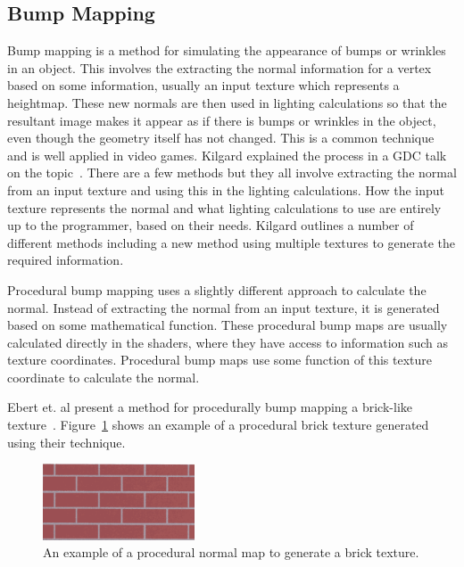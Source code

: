 \subsection{Bump Mapping}
\label{sec:bumpmapping}
Bump mapping is a method for simulating the appearance of bumps or wrinkles in an object.
This involves the extracting the normal information for a vertex based on some information, usually an input texture which represents a heightmap.
These new normals are then used in lighting calculations so that the resultant image makes it appear as if there is bumps or wrinkles in the object, even though the geometry itself has not changed.
This is a common technique and is well applied in video games.
Kilgard explained the process in a GDC talk on the topic~\cite{kilgard2000practical}.
There are a few methods but they all involve extracting the normal from an input texture and using this in the lighting calculations.
How the input texture represents the normal and what lighting calculations to use are entirely up to the programmer, based on their needs. 
Kilgard outlines a number of different methods including a new method using multiple textures to generate the required information.

Procedural bump mapping uses a slightly different approach to calculate the normal.
Instead of extracting the normal from an input texture, it is generated based on some mathematical function.
These procedural bump maps are usually calculated directly in the shaders, where they have access to information such as texture coordinates.
Procedural bump maps use some function of this texture coordinate to calculate the normal.

Ebert et. al present a method for procedurally bump mapping a brick-like texture~\cite{ebert2003texturing}.
Figure~\ref{fig:procbricktexture} shows an example of a procedural brick texture generated using their technique.

\begin{figure}
  \centering
  \includegraphics[width=0.4\textwidth]{images/procbricktexture}
  \caption{An example of a procedural normal map to generate a brick texture.}
  \label{fig:procbricktexture}
\end{figure}
